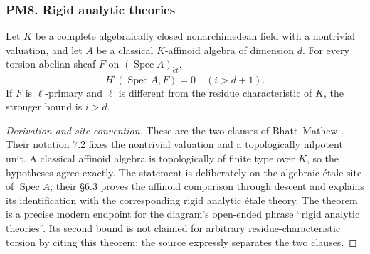 \subsubsection{PM8. Rigid analytic theories}
\begin{theorem}\label{B:PM8}
Let $K$ be a complete algebraically closed nonarchimedean field with a nontrivial valuation, and let $A$ be a classical $K$-affinoid algebra of dimension $d$. For every torsion abelian sheaf $F$ on $(\operatorname{Spec}A)_{\acute et}$,
\[
 H^i(\operatorname{Spec}A,F)=0\quad(i>d+1).
\]
If $F$ is $\ell$-primary and $\ell$ is different from the residue characteristic of $K$, the stronger bound is $i>d$.
\end{theorem}
\begin{proof}[Derivation and site convention]
These are the two clauses of Bhatt--Mathew \cite[Theorem 7.3]{BBhattMathew2021}. Their notation 7.2 fixes the nontrivial valuation and a topologically nilpotent unit. A classical affinoid algebra is topologically of finite type over $K$, so the hypotheses agree exactly. The statement is deliberately on the algebraic \'etale site of $\operatorname{Spec}A$; their \S6.3 proves the affinoid comparison through descent and explains its identification with the corresponding rigid analytic \'etale theory. The theorem is a precise modern endpoint for the diagram's open-ended phrase ``rigid analytic theories''. Its second bound is not claimed for arbitrary residue-characteristic torsion by citing this theorem: the source expressly separates the two clauses.
\end{proof}

